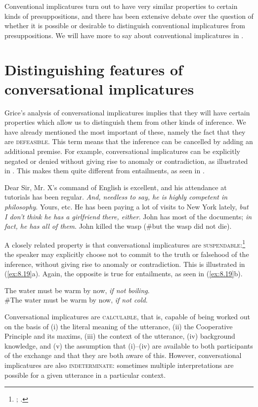 Conventional implicatures turn out to have very similar properties to certain kinds of presuppositions, and there has been extensive debate over the question of whether it is possible or desirable to distinguish conventional implicatures from presuppositions. We will have more to say about conventional implicatures in .


\section{Distinguishing features of conversational implicatures}\label{sec:8.5}

Grice’s analysis of conversational implicatures implies that they will have certain properties which allow us to distinguish them from other kinds of inference. We have already mentioned the most important of these, namely the fact that they are \textsc{defeasible}. This term means that the inference can be cancelled by adding an additional premise. For example, conversational implicatures can be explicitly negated or denied without giving rise to anomaly or contradiction, as illustrated in . This makes them quite different from entailments, as seen in .


\ea \label{ex:8.17}
\ea  Dear Sir, Mr. X’s command of English is excellent, and his attendance at tutorials has been regular. \textit{And, needless to say, he is highly competent in philosophy}. Yours, etc.
\ex He has been paying a lot of visits to New York lately, \textit{but I don’t think he has a girlfriend there, either}.
\ex John has most of the documents; \textit{in fact, he has all of them}.
\z \z
\ea \label{ex:8.18}
John killed the wasp (\#but the wasp did not die).
\z 


A closely related property is that conversational implicatures are \textsc{suspendable}:\footnote{\citet{Horn1972}; \citet{Sadock1978}.} the speaker may explicitly choose not to commit to the truth or falsehood of the inference, without giving rise to anomaly or contradiction. This is illustrated in (\ref{ex:8.19}a). Again, the opposite is true for entailments, as seen in (\ref{ex:8.19}b).


\ea \label{ex:8.19}
\ea The water must be warm by now, \textit{if not boiling}.\\
\ex \#The water must be warm by now, \textit{if not cold}.
                       \z
\z


Conversational implicatures are \textsc{calculable}, that is, capable of being worked out on the basis of (i) the literal meaning of the utterance, (ii) the Cooperative Principle and its maxims, (iii) the context of the utterance, (iv) background knowledge, and (v) the assumption that (i)--(iv) are available to both participants of the exchange and that they are both aware of this. However, conversational implicatures are also \textsc{indeterminate}: sometimes multiple interpretations are possible for a given utterance in a particular context.




